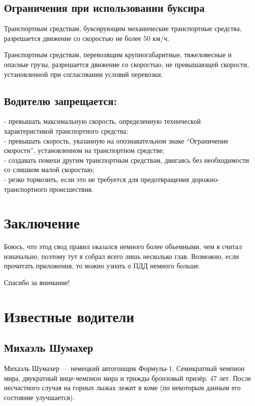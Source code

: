 \documentclass[russian,english,12pt,a4paper,reqno,dviphfm,oneside]{book}
\begin{document}
{\section{Ограничения при использовании буксира} Транспортным средствам, буксирующим механические транспортные средства, разрешается движение со скоростью не более 50 км/ч.

Транспортным средствам, перевозящим крупногабаритные, тяжеловесные и опасные грузы, разрешается движение со скоростью, не превышающей скорости, установленной при согласовании условий перевозки.

\section[Водителю запрещается]{Водителю запрещается:}
- превышать максимальную скорость, определенную технической характеристикой транспортного средства;\\
- превышать скорость, указанную на опознавательном знаке “Ограничение скорости”, установленном на транспортном средстве;\\
- создавать помехи другим транспортным средствам, двигаясь без необходимости со слишком малой скоростью;\\
- резко тормозить, если это не требуется для предотвращения дорожно-транспортного происшествия.\\



\chapter*{Заключение}


Боюсь, что этод свод правил оказался немного более объемными, чем я считал изначально, поэтому тут я собрал всего лишь несколько глав. Возможно, если прочитать приложения, то можно узнать о ПДД немного больше. 

Спасибо за внимание!

\tableofcontents

\appendix
\chapter[Известные водители]{Известные водители}
\section{Михаэль Шумахер}
Михаэль Шумахер --- немецкий автогонщик Формулы-1. Семикратный чемпион мира, двукратный вице-чемпион мира и трижды бронзовый призёр. 47 лет. После несчастного случая на горных лыжах лежит в коме (по некоторым данным его состояние улучшается).
}
\end{document}
